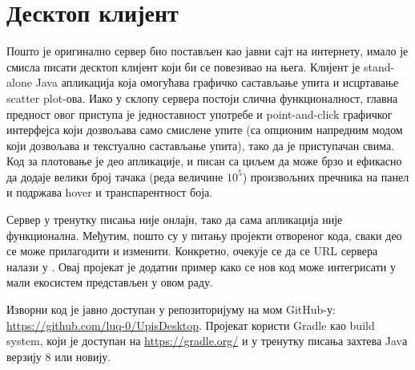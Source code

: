 \chapter{Десктоп клијент}\label{ch:A}

Пошто је оригинално сервер био постављен као јавни сајт на интернету, имало је смисла писати десктоп клијент који би се повезивао на њега. Клијент је stand-alone Java апликација која омогућава графичко састављање упита и исцртавање scatter plot-ова. Иако у склопу сервера постоји слична функционалност, главна предност овог приступа је једноставност употребе и point-and-click графичког интерфејса који дозвољава само смислене упите (са опционим напредним модом који дозвољава и текстуално састављање упита), тако да је приступачан свима. Код за плотовање је део апликације, и писан са циљем да може брзо и ефикасно да додаје велики број тачака (реда величине $10^5$) произвољних пречника на панел и подржава hover и транспарентност боја.

Сервер у тренутку писања није онлајн, тако да сама апликација није функционална. Међутим, пошто су у питању пројекти отвореног кода, сваки део се може прилагодити и изменити. Конкретно, очекује се да се URL сервера налази у . Овај пројекат је додатни пример како се нов код може интегрисати у мали екосистем представљен у овом раду.

Изворни код је јавно доступан у репозиторијуму на мом GitHub-у:  \url{https://github.com/luq-0/UpisDesktop}. Пројекат користи Gradle као build system, који је доступан на \url{https://gradle.org/} и у тренутку писања захтева Javа верзију 8 или новију.